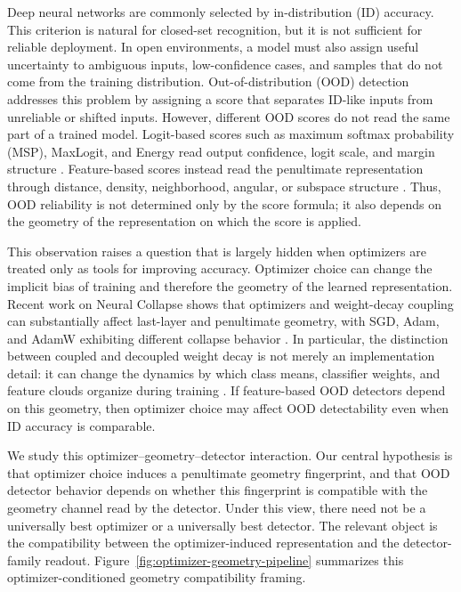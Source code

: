 Deep neural networks are commonly selected by in-distribution (ID) accuracy.
This criterion is natural for closed-set recognition, but it is not sufficient
for reliable deployment. In open environments, a model must also assign useful
uncertainty to ambiguous inputs, low-confidence cases, and samples that do not
come from the training distribution. Out-of-distribution (OOD) detection addresses
this problem by assigning a score that separates ID-like inputs from unreliable
or shifted inputs. However, different OOD scores do not read the same part of a
trained model. Logit-based scores such as maximum softmax probability (MSP),
MaxLogit, and Energy read output confidence, logit scale, and margin structure
\citep{hendrycks2017baseline,liu2020energy}. Feature-based scores instead read
the penultimate representation through distance, density, neighborhood, angular,
or subspace structure
\citep{lee2018simple,sun2022knn,mukhoti2021ddu,nguyen2023ctm,benammar2023neco}.
Thus, OOD reliability is not determined only by the score formula; it also
depends on the geometry of the representation on which the score is applied.

This observation raises a question that is largely hidden when optimizers are
treated only as tools for improving accuracy. Optimizer choice can change the
implicit bias of training and therefore the geometry of the learned
representation. Recent work on Neural Collapse shows that optimizers and
weight-decay coupling can substantially affect last-layer and penultimate
geometry, with SGD, Adam, and AdamW exhibiting different collapse behavior
\citep{papyan2020prevalence,zhao2026optimizer}. In particular, the distinction
between coupled and decoupled weight decay is not merely an implementation
detail: it can change the dynamics by which class means, classifier weights, and
feature clouds organize during training \citep{loshchilov2019decoupled}. If
feature-based OOD detectors depend on this geometry, then optimizer choice may
affect OOD detectability even when ID accuracy is comparable.

We study this optimizer--geometry--detector interaction. Our central hypothesis
is that optimizer choice induces a penultimate geometry fingerprint, and that OOD
detector behavior depends on whether this fingerprint is compatible with the
geometry channel read by the detector. Under this view, there need not be a
universally best optimizer or a universally best detector. The relevant object is
the compatibility between the optimizer-induced representation and the
detector-family readout. Figure~\ref{fig:optimizer-geometry-pipeline}
summarizes this optimizer-conditioned geometry compatibility framing.

